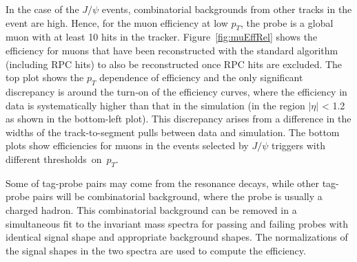 \documentclass{JINST}
\begin{document}
In the case of the $J/\psi$ events, combinatorial backgrounds from other tracks in the event are high.
Hence, for the muon efficiency at low $p_T$, the probe is a global muon with at least 10 hits in the tracker.
Figure~\ref{fig:muEffRel} shows the efficiency for muons that have been reconstructed with the standard algorithm (including RPC hits) to also be reconstructed once RPC hits are excluded.
The top plot shows the $p_T$ dependence of efficiency and the only significant discrepancy is around the turn-on of the efficiency curves, where the efficiency in data is systematically higher than that in the simulation (in the region $|\eta|$ < 1.2 as shown in the bottom-left plot). This discrepancy arises from a difference in the widths of the track-to-segment pulls between data and simulation.
The bottom plots show efficiencies for muons %
in the events selected by $J/\psi$ triggers with different thresholds~on~$p_T$.

Some of tag-probe pairs may come from the resonance decays, while  other tag-probe pairs will be combinatorial background, where the probe is usually a charged hadron.
This combinatorial background can be removed in a simultaneous fit to the invariant mass spectra for passing and failing probes with identical signal shape and appropriate background shapes. The normalizations of the signal shapes in the two spectra are used to compute the efficiency.
\end{document}
